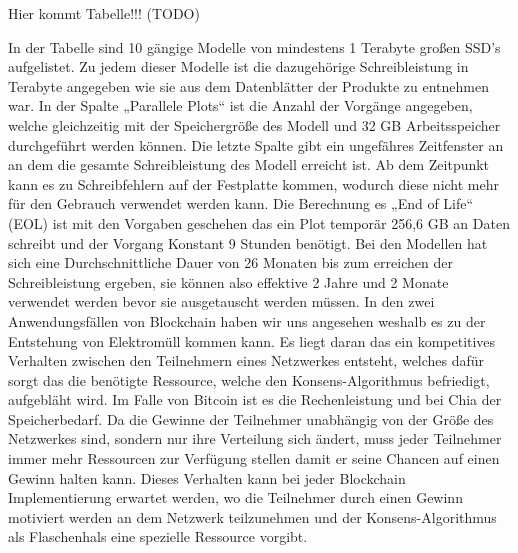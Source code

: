 Hier kommt Tabelle!!! (TODO)

In der Tabelle sind 10 gängige Modelle von mindestens 1 Terabyte großen SSD’s aufgelistet. Zu jedem dieser Modelle ist die dazugehörige Schreibleistung in Terabyte angegeben wie sie aus dem Datenblätter der Produkte zu entnehmen war. In der Spalte „Parallele Plots“ ist  die Anzahl der Vorgänge angegeben, welche gleichzeitig mit der Speichergröße des Modell und 32 GB Arbeitsspeicher durchgeführt werden können. Die letzte Spalte gibt ein ungefähres Zeitfenster an an dem die gesamte Schreibleistung des Modell erreicht ist. Ab dem Zeitpunkt kann es zu Schreibfehlern auf der Festplatte kommen, wodurch diese nicht mehr für den Gebrauch verwendet werden kann. Die Berechnung es „End of Life“ (EOL) ist mit den Vorgaben geschehen das ein Plot temporär 256,6 GB an Daten schreibt und der Vorgang Konstant 9 Stunden benötigt. Bei den Modellen hat sich eine Durchschnittliche Dauer von 26 Monaten bis zum erreichen der Schreibleistung ergeben, sie können also effektive 2 Jahre und 2 Monate verwendet werden bevor sie ausgetauscht werden müssen.
\newline
In den zwei Anwendungsfällen von Blockchain haben wir uns angesehen weshalb es zu der Entstehung von Elektromüll kommen kann. Es liegt daran das ein kompetitives Verhalten zwischen den Teilnehmern eines Netzwerkes entsteht, welches dafür sorgt das die benötigte Ressource, welche den Konsens-Algorithmus befriedigt, aufgebläht wird. Im Falle von Bitcoin ist es die Rechenleistung und bei Chia der Speicherbedarf. Da die Gewinne der Teilnehmer unabhängig von der Größe des Netzwerkes sind, sondern nur ihre Verteilung sich ändert, muss jeder Teilnehmer immer mehr Ressourcen zur Verfügung stellen damit er seine Chancen auf einen Gewinn halten kann. Dieses Verhalten kann bei jeder Blockchain Implementierung erwartet werden, wo die Teilnehmer durch einen Gewinn motiviert werden an dem Netzwerk teilzunehmen und der Konsens-Algorithmus als Flaschenhals eine spezielle Ressource vorgibt.

